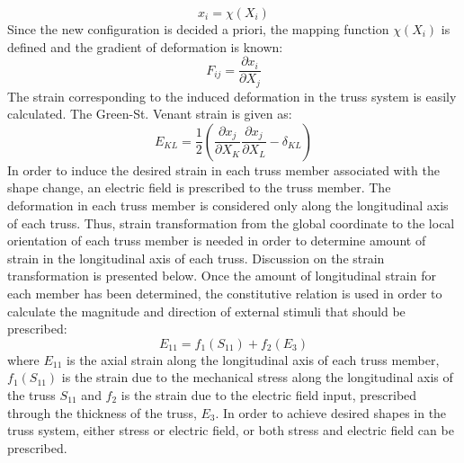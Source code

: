 \begin{equation}  
x_i=\chi (X_i)   
\label{lagrangian_descriptoin} 
\end{equation}
Since the new configuration is decided a priori, the mapping function $\chi (X_i)$ is defined and the gradient of deformation is known:
\begin{equation}
F_{ij}=\frac{\partial x_i}{\partial X_j}
\label{deformation_gradient_tensor}
\end{equation}
The strain corresponding to the induced deformation in the truss system is easily calculated.  
The Green-St. Venant strain is given as:
\begin{equation}
E_{KL}=\frac{1}{2}\left( \frac{\partial x_j}{\partial X_K}\frac{\partial x_j}{\partial X_L}-\delta_{KL}\right)
\label{lagrange_green_strain}
\end{equation}
In order to induce the desired strain in each truss member associated with the shape change, an electric field is prescribed to the truss member. The deformation in each truss member is considered only along the longitudinal axis of each truss. Thus, strain transformation from the global coordinate to the local orientation of each truss member is needed in order to determine amount of strain in the longitudinal axis of each truss. Discussion on the strain transformation is presented below. Once the amount of longitudinal strain for each member has been determined, the constitutive relation is used in order to calculate the magnitude and direction of external stimuli that should be prescribed: 
\begin{equation}
E_{11}=f_1(S_{11})+f_2(E_3)
\label{one_constitutive_equation}
\end{equation}
where $E_{11}$ is the axial strain along the longitudinal axis of each truss member, $f_1(S_{11})$ is the strain due to the mechanical stress along the longitudinal axis of the truss $S_{11}$ and $f_2$ is the strain due to the electric field input, prescribed through the thickness of the truss, $E_3$.
In order to achieve desired shapes in the truss system, either stress or electric field, or both stress and electric field can be prescribed.
\\
